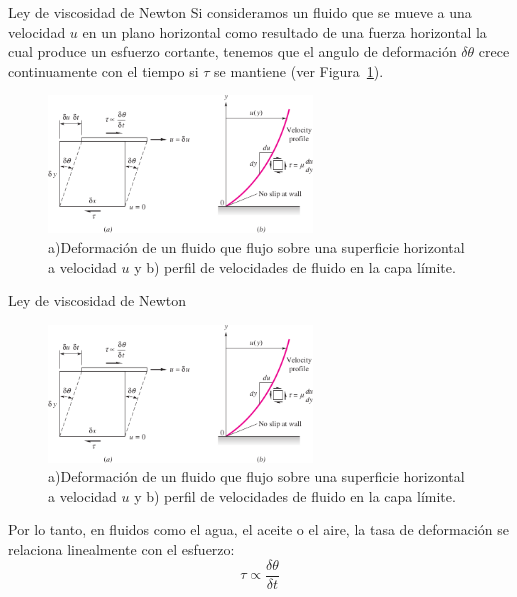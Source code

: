 \documentclass [xcolor=svgnames, t] {beamer}
\begin{document}
\begin{frame}{Ley de viscosidad de Newton}
Si consideramos un fluido que se mueve a una velocidad $u$ en un plano horizontal como resultado de una fuerza horizontal la cual produce un esfuerzo cortante, tenemos que el angulo de deformaci\'on $\delta \theta$ crece continuamente con el tiempo si $\tau$ se mantiene (ver Figura~\ref{visco}).

\begin{figure}[h]
\centering
\includegraphics[width=7cm]{visco}
\caption{a)Deformaci\'on de un fluido que flujo sobre una superficie horizontal a velocidad $u$ y  b) perfil de velocidades de fluido en la capa l\'imite.}
\label{visco}
\end{figure}

\end{frame}

\begin{frame}{Ley de viscosidad de Newton}
\vspace{-0.4cm}
\begin{figure}[h]
\centering
\includegraphics[width=7cm]{visco}
\caption{a)Deformaci\'on de un fluido que flujo sobre una superficie horizontal a velocidad $u$ y  b) perfil de velocidades de fluido en la capa l\'imite.}
\end{figure}

Por lo tanto, en fluidos como el agua, el aceite o el aire, la tasa de deformaci\'on se relaciona linealmente con el esfuerzo:
\begin{equation}
\tau \propto \frac{\delta \theta}{\delta t}
\label{vis1}
\end{equation}
\end{frame}
\end{document}
